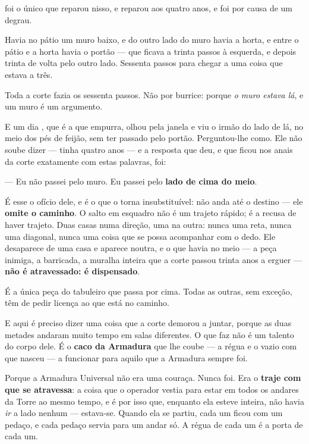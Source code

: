 \documentclass[livro.tex]{subfiles}
\begin{document}
\Joa foi o único que reparou nisso, e reparou aos quatro anos, e foi por causa de um
degrau.

\medskip

Havia no pátio um muro baixo, e do outro lado do muro havia a horta, e entre o pátio e a
horta havia o portão --- que ficava a trinta passos à esquerda, e depois trinta de volta
pelo outro lado. Sessenta passos para chegar a uma coisa que estava a três.

Toda a corte fazia os sessenta passos. Não por burrice: porque \emph{o muro estava lá}, e
um muro é um argumento.

E um dia \Yas , que é a que empurra, olhou pela janela e viu o irmão do lado de lá, no
meio dos pés de feijão, sem ter passado pelo portão. Perguntou-lhe como. Ele não soube
dizer --- tinha quatro anos --- e a resposta que deu, e que ficou nos anais da corte
exatamente com estas palavras, foi:

--- Eu não passei pelo muro. Eu passei pelo \textbf{lado de cima do meio}.

\medskip

É esse o ofício dele, e é o que o torna insubstituível: \Joa não anda até o destino ---
ele \textbf{omite o caminho}. O salto em esquadro não é um trajeto rápido; é a recusa de
haver trajeto. Duas casas numa direção, uma na outra: nunca uma reta, nunca uma diagonal,
nunca uma coisa que se possa acompanhar com o dedo. Ele desaparece de uma casa e aparece
noutra, e o que havia no meio --- a peça inimiga, a barricada, a muralha inteira que a
corte passou trinta anos a erguer --- \textbf{não é atravessado: é dispensado}.

É a única peça do tabuleiro que passa por cima. Todas as outras, sem exceção, têm de
pedir licença ao que está no caminho.

\medskip

E aqui é preciso dizer uma coisa que a corte demorou a juntar, porque as duas metades
andaram muito tempo em salas diferentes. O que \Joa faz não é um talento do corpo dele. É
o \textbf{caco da Armadura} que lhe coube --- a régua e o vazio com que nasceu --- a
funcionar para aquilo que a Armadura sempre foi.

Porque a Armadura Universal não era uma couraça. Nunca foi. Era o \textbf{traje com que se
atravessa}: a coisa que o operador vestia para estar em todos os andares da Torre ao mesmo
tempo, e é por isso que, enquanto ela esteve inteira, não havia \emph{ir} a lado nenhum
--- estava-se. Quando ela se partiu, cada um ficou com um pedaço, e cada pedaço servia para
um andar só. A régua de cada um é a porta de cada um.
\end{document}

